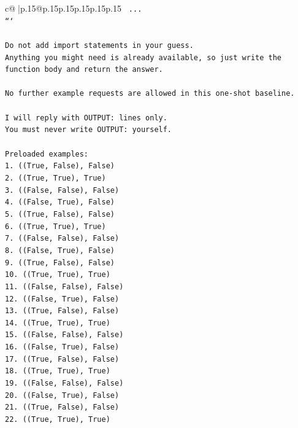 \documentclass{article}
\begin{document}
{\begin{supertabular}{c@{$\;$}|p{.15\linewidth}@{}p{.15\linewidth}p{.15\linewidth}p{.15\linewidth}p{.15\linewidth}p{.15\linewidth}}
{{{\texttt{    ...} \\
\texttt{```} \\
\\ 
\texttt{Do not add import statements in your guess.} \\
\texttt{Anything you might need is already available, so just write the function body and return the answer.} \\
\\ 
\texttt{No further example requests are allowed in this one{-}shot baseline.} \\
\\ 
\texttt{I will reply with OUTPUT: lines only.} \\
\texttt{You must never write OUTPUT: yourself.} \\
\\ 
\texttt{Preloaded examples:} \\
\texttt{1. ((True, False), False)} \\
\texttt{2. ((True, True), True)} \\
\texttt{3. ((False, False), False)} \\
\texttt{4. ((False, True), False)} \\
\texttt{5. ((True, False), False)} \\
\texttt{6. ((True, True), True)} \\
\texttt{7. ((False, False), False)} \\
\texttt{8. ((False, True), False)} \\
\texttt{9. ((True, False), False)} \\
\texttt{10. ((True, True), True)} \\
\texttt{11. ((False, False), False)} \\
\texttt{12. ((False, True), False)} \\
\texttt{13. ((True, False), False)} \\
\texttt{14. ((True, True), True)} \\
\texttt{15. ((False, False), False)} \\
\texttt{16. ((False, True), False)} \\
\texttt{17. ((True, False), False)} \\
\texttt{18. ((True, True), True)} \\
\texttt{19. ((False, False), False)} \\
\texttt{20. ((False, True), False)} \\
\texttt{21. ((True, False), False)} \\
\texttt{22. ((True, True), True)} \\
}}}
\end{supertabular}}
\end{document}
